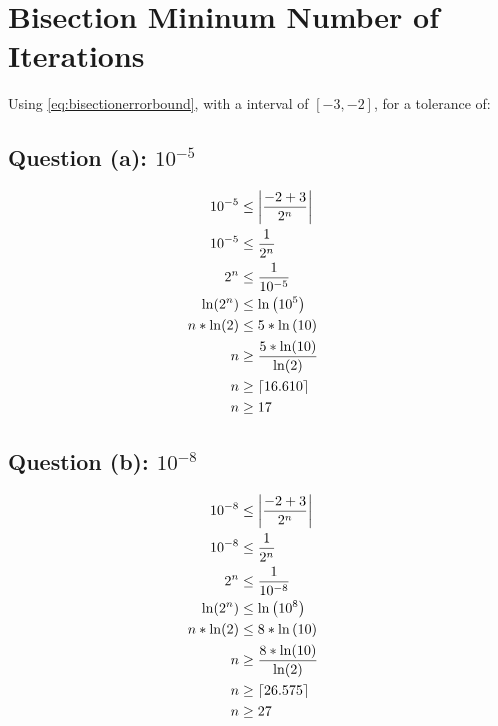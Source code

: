 \section{Bisection Mininum Number of Iterations}

Using \cref{eq:bisectionerrorbound}, with a interval of $[-3,-2]$, for a tolerance of:

\subsection{Question (a): $10^{-5}$}
	
	\begin{align}
		10^{-5} &\le \left|\frac{-2 + 3}{2^{n}}\right|& \notag \\
		10^{-5} &\le \frac{1}{2^{n}}& \notag \\
		2^{n} &\le \frac{1}{10^{-5}}& \notag \\
		\ln(2^{n}) &\le \ln\left(10^{5}\right)& \notag \\
		n*\ln(2) &\le 5*\ln\left(10\right)& \notag \\
		n &\ge \frac{5*\ln(10)}{\ln(2)}& \notag \\
		n &\ge \lceil 16.610 \rceil& \notag \\
		n &\ge 17& \notag \\
	\label{eq:37a}
	\end{align}
	

\subsection{Question (b): $10^{-8}$}

	\begin{align}
		10^{-8} &\le \left|\frac{-2 + 3}{2^{n}}\right|& \notag \\
		10^{-8} &\le \frac{1}{2^{n}}& \notag \\
		2^{n} &\le \frac{1}{10^{-8}}& \notag \\
		\ln(2^{n}) &\le \ln\left(10^{8}\right)& \notag \\
		n*\ln(2) &\le 8*\ln\left(10\right)& \notag \\
		n &\ge \frac{8*\ln(10)}{\ln(2)}& \notag \\
		n &\ge \lceil 26.575 \rceil& \notag \\
		n &\ge 27& \notag \\
	\label{eq:37a}
	\end{align}
